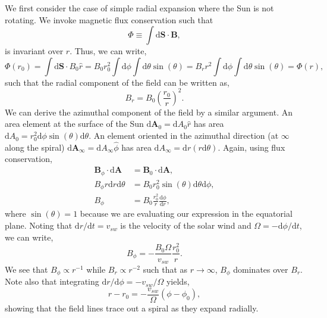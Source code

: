 	We first consider the case of simple radial expansion where the Sun is not rotating. We invoke magnetic flux conservation such that 
	\begin{equation}
		\Phi\equiv\int\mathrm{d}\mathbf{S}\cdot\mathbf{B},
	\end{equation}
	is invariant over $r$. Thus, we can write,
	\begin{equation}
		\Phi(r_0)=\int\mathrm{d}\mathbf{S}\cdot B_0\hat{r} = B_0r_0^2\int\mathrm{d}\phi\int\mathrm{d}\theta\sin{(\theta)} = B_rr^2\int\mathrm{d}\phi\int\mathrm{d}\theta\sin{(\theta)} = \Phi(r),
	\end{equation}
	such that the radial component of the field can be written as,
	\begin{equation}
		B_r = B_0\left(\frac{r_0}{r}\right)^2.
	\end{equation}
	We can derive the azimuthal component of the field by a similar argument. An area element at the surface of the Sun $\mathrm{d}\mathbf{A}_0=\mathrm{d}A_0\hat{r}$ has area $\mathrm{d}A_0=r_0^2\mathrm{d}\phi\sin{(\theta)}\mathrm{d}\theta$. An element oriented in the azimuthal direction (at $\infty$ along the spiral) $\mathrm{d}\mathbf{A}_{\infty}=\mathrm{d}A_{\infty}\hat{\phi}$ has area $\mathrm{d}A_{\infty} = \mathrm{d}r(r\mathrm{d}\theta)$. Again, using flux conservation,
	\begin{align}
		\mathbf{B}_{\phi}\cdot\mathrm{d}\mathbf{A} &= \mathbf{B}_0\cdot\mathrm{d}\mathbf{A}, \\
		B_{\phi}r\mathrm{d}r\mathrm{d}\theta &= B_0r_0^2\sin{(\theta)}\mathrm{d}\theta\mathrm{d}\phi, \\
		B_{\phi} &= B_0\frac{r_0^2}{r}\frac{\mathrm{d}\phi}{\mathrm{d}r},
	\end{align}
	where $\sin{(\theta)}=1$ because we are evaluating our expression in the equatorial plane. Noting that $\mathrm{d}r/\mathrm{d}t=v_{sw}$ is the velocity of the solar wind and $\Omega=-\mathrm{d}\phi/\mathrm{d}t$, we can write,
	\begin{equation}
		B_{\phi} = -\frac{B_0\Omega}{v_{sw}}\frac{r_0^2}{r}.
	\end{equation}
	We see that $B_{\phi}\propto r^{-1}$ while $B_r\propto r^{-2}$ such that as $r\to\infty$, $B_\phi$ dominates over $B_r$. Note also that integrating $\mathrm{d}r/\mathrm{d}\phi=-v_{sw}/\Omega$ yields,
	\begin{equation}
		r - r_0 = -\frac{v_{sw}}{\Omega}(\phi - \phi_0),
	\end{equation}
	showing that the field lines trace out a spiral as they expand radially.

